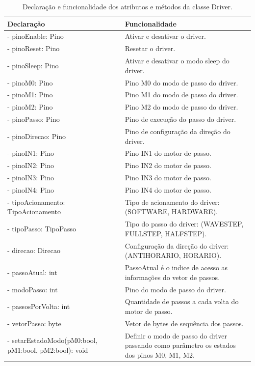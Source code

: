 \begin{table}
    \centering
    \caption{Declaração e funcionalidade dos atributos e métodos da classe Driver.}
    \begin{tabular}{lp{6cm}}
        \hline
        \textbf{Declaração} & \textbf{Funcionalidade}\\
        \hline
        - pinoEnable: Pino & Ativar e desativar o driver.\\
        - pinoReset: Pino & Resetar o driver.\\
        - pinoSleep: Pino & Ativar e desativar o modo sleep do driver.\\
        - pinoM0: Pino & Pino M0 do modo de passo do driver.\\
        - pinoM1: Pino & Pino M1 do modo de passo do driver.\\
        - pinoM2: Pino & Pino M2 do modo de passo do driver.\\
        - pinoPasso: Pino & Pino de execução do passo do driver.\\
        - pinoDirecao: Pino & Pino de configuração da direção do driver.\\
        - pinoIN1: Pino & Pino IN1 do motor de passo.\\
        - pinoIN2: Pino & Pino IN2 do motor de passo.\\
        - pinoIN3: Pino & Pino IN3 do motor de passo.\\
        - pinoIN4: Pino & Pino IN4 do motor de passo.\\
        - tipoAcionamento: TipoAcionamento & Tipo de acionamento do driver: (SOFTWARE, HARDWARE).\\
        - tipoPasso: TipoPasso & Tipo do passo do driver: (WAVESTEP, FULLSTEP, HALFSTEP).\\
        - direcao: Direcao & Configuração da direção do driver: (ANTIHORARIO, HORARIO).\\
        - passoAtual: int & PassoAtual é o indice de acesso as informações do vetor de passos.\\
        - modoPasso: int & Pino do modo de passo do driver.\\
        - passosPorVolta: int & Quantidade de passos a cada volta do motor de passo.\\
        - vetorPasso: byte & Vetor de bytes de sequência dos passos.\\
        - setarEstadoModo(pM0:bool, pM1:bool, pM2:bool): void & Definir o modo de passo do driver passando como parâmetro os estados dos pinos M0, M1, M2.\\

\end{tabular}
\end{table}
